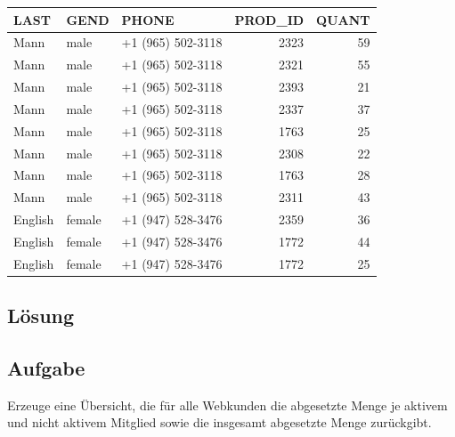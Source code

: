 \begin{table}[H]
  \centering
  \ttfamily
  \begin{tabular}{|l|l|l|r|r|}
    \hline
    \textbf{LAST} & \textbf{GEND} & \textbf{PHONE}    & \textbf{PROD\_ID} & \textbf{QUANT}  \\
    \hline
    Mann          & male          & +1 (965) 502-3118 & 2323              & 59              \\
    Mann          & male          & +1 (965) 502-3118 & 2321              & 55              \\
    Mann          & male          & +1 (965) 502-3118 & 2393              & 21              \\
    Mann          & male          & +1 (965) 502-3118 & 2337              & 37              \\
    Mann          & male          & +1 (965) 502-3118 & 1763              & 25              \\
    Mann          & male          & +1 (965) 502-3118 & 2308              & 22              \\
    Mann          & male          & +1 (965) 502-3118 & 1763              & 28              \\
    Mann          & male          & +1 (965) 502-3118 & 2311              & 43              \\
    English       & female        & +1 (947) 528-3476 & 2359              & 36              \\
    English       & female        & +1 (947) 528-3476 & 1772              & 44              \\
    English       & female        & +1 (947) 528-3476 & 1772              & 25              \\
    \hline
  \end{tabular}
\end{table}

\subsection*{Lösung}
\label{sec:uebung_10.aufgabe_02.loesung}


\subsection{Aufgabe}
\label{sec:uebung_10.aufgabe_03}
Erzeuge eine Übersicht, die für alle Webkunden die abgesetzte Menge je aktivem und nicht aktivem Mitglied sowie die insgesamt abgesetzte Menge zurückgibt.

